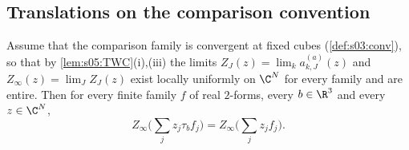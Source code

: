 \subsection{Translations on the comparison convention}

\begin{proposition}\label{prop:s06:translations}
Assume that the comparison family is convergent at fixed cubes (\cref{def:s03:conv}), so that by \cref{lem:s05:TWC}(i),(iii) the limits $Z_J(z)=\lim_ka^{(a)}_{k,J}(z)$ and $Z_\infty(z)=\lim_JZ_J(z)$ exist locally uniformly on $\C^N$ for every family and are entire. Then for every finite family $f$ of real $2$-forms, every $b\in\R^3$ and every $z\in\C^N$,
\[
Z_\infty\Big(\sum_jz_j\tau_bf_j\Big)=Z_\infty\Big(\sum_jz_jf_j\Big).
\]
\end{proposition}

